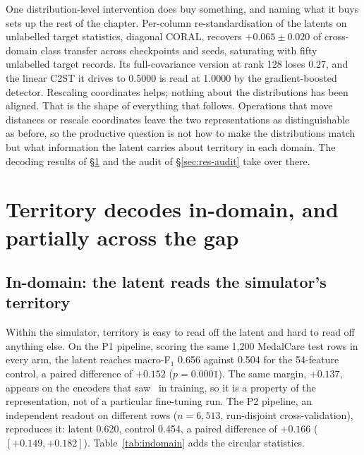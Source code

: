 One distribution-level intervention does buy something, and naming what it buys sets up the rest of the chapter. Per-column re-standardisation of the latents on unlabelled target statistics, diagonal CORAL, recovers $+0.065 \pm 0.020$ of cross-domain class transfer across checkpoints and seeds, saturating with fifty unlabelled target records. Its full-covariance version at rank 128 loses 0.27, and the linear C2ST it drives to 0.5000 is read at 1.0000 by the gradient-boosted detector. Rescaling coordinates helps; nothing about the distributions has been aligned. That is the shape of everything that follows. Operations that move distances or rescale coordinates leave the two representations as distinguishable as before, so the productive question is not how to make the distributions match but what information the latent carries about territory in each domain. The decoding results of \S\ref{sec:res-decode} and the audit of \S\ref{sec:res-audit} take over there. 

\section[Territory decoding in and across domains]{Territory decodes in-domain, and partially across the gap}
\label{sec:res-decode}

\subsection{In-domain: the latent reads the simulator's territory}
\label{sec:indomain}

Within the simulator, territory is easy to read off the latent and hard to read off anything else. On the P1 pipeline, scoring the same 1,200 MedalCare test rows in every arm, the latent reaches macro-F$_1$ 0.656 against 0.504 for the 54-feature control, a paired difference of $+0.152$ ($p=0.0001$). The same margin, $+0.137$, appears on the encoders that saw \ptbxl\ in training, so it is a property of the representation, not of a particular fine-tuning run. The P2 pipeline, an independent readout on different rows ($n=6{,}513$, run-disjoint cross-validation), reproduces it: latent 0.620, control 0.454, a paired difference of $+0.166$ ($[+0.149, +0.182]$). Table~\ref{tab:indomain} adds the circular statistics. 

